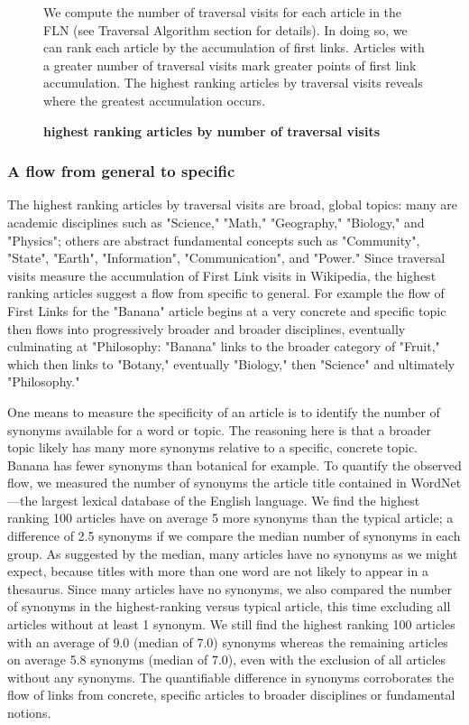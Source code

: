\documentclass[pre,twocolumn,twoside,superscriptaddress,floatfix, aps, 10pt]{revtex4-1}
\begin{document}
\begin{figure}[tp!]
  \caption{
    \textbf{highest ranking articles by number of traversal visits}
  }
  We compute the number of traversal visits for each article in the FLN (see 
  Traversal Algorithm section for details). In doing so, we can rank each article
  by the accumulation of first links. Articles with a greater number of traversal visits
  mark greater points of first link accumulation. The highest ranking articles by traversal visits reveals where the greatest accumulation occurs.
  \label{fig:highest visits}
\end{figure}


\subsubsection{A flow from general to specific}

The highest ranking articles by traversal visits are 
broad, global topics: 
many are academic disciplines such as "Science," "Math," 
"Geography," "Biology," and "Physics"; others are abstract fundamental concepts such as 
"Community", "State", "Earth", "Information", "Communication", and "Power."
Since traversal visits measure the accumulation of First Link visits in Wikipedia, 
the highest ranking articles suggest a flow from specific to general. 
For example the flow of First Links for the "Banana" article begins at a very concrete
and specific topic then flows into progressively broader and broader disciplines, eventually 
culminating at "Philosophy: "Banana" links to the broader category of "Fruit," which then links to 
"Botany," eventually "Biology," then "Science" and ultimately "Philosophy." 

One means to measure the specificity of an article is to identify the number of synonyms available for a word or topic. The reasoning here is that a  broader topic likely has many more synonyms relative to a specific, concrete topic. Banana has fewer synonyms than botanical for example. To quantify the observed flow, we measured the number of synonyms the article title contained in WordNet---the largest lexical database of the English language. We find the highest ranking 100 articles have on average 5 more synonyms than the typical article; a difference of 2.5 synonyms if we compare the median number of synonyms in each group. As suggested by the median, many articles have no synonyms as we might expect, because titles with more than one word are not likely to appear in a thesaurus. Since many articles have no synonyms, we also compared the number of synonyms in the highest-ranking versus typical article, this time excluding all articles without at least 1 synonym. We still find the highest ranking 100 articles with an average of 9.0 (median of 7.0) synonyms whereas the remaining articles on average 5.8 synonyms (median of 7.0), even with the exclusion of all articles without any synonyms.
The quantifiable difference in synonyms corroborates the flow of links from concrete, specific articles to broader disciplines or fundamental notions.
\end{document}

